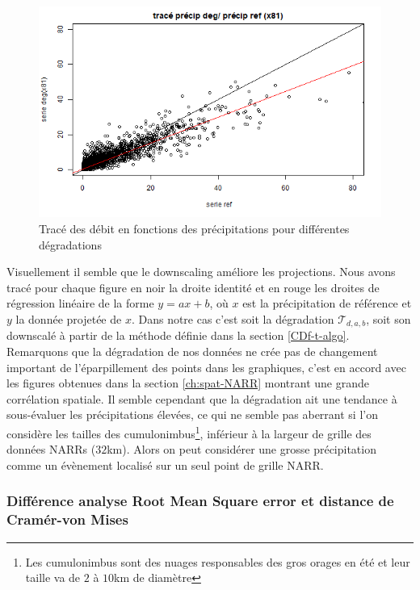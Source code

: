 \documentclass[a4paper,11pt]{article}
\begin{document}
\begin{figure}
\begin{minipage}[b]{0.48\linewidth}
	\end{minipage}\hfill
	\begin{minipage}[b]{0.48\linewidth}	
		\centering \includegraphics[scale=0.4]{images/pr_4_dg.png}
	\end{minipage}
	\caption{Tracé des débit en fonctions des précipitations pour différentes dégradations}
\end{figure} 


Visuellement il semble que le downscaling améliore les projections. Nous avons tracé pour chaque figure en noir la droite identité et en rouge les droites de régression linéaire de la forme $y=ax+b$, où $x$ est la précipitation de référence et $y$ la donnée projetée de $x$. Dans notre cas c'est soit la dégradation $\mathcal{T}_{d,a,b}$, soit son downscalé à partir de la méthode définie dans la section \ref{CDf-t-algo}. Remarquons que la dégradation de nos données ne crée pas de changement important de l'éparpillement des points dans les graphiques, c'est en accord avec les figures obtenues dans la section \ref{ch:spat-NARR} montrant une grande corrélation spatiale. Il semble cependant que la dégradation ait une tendance à sous-évaluer les précipitations élevées, ce qui ne semble pas aberrant si l'on considère les tailles des cumulonimbus\footnote{Les cumulonimbus sont des nuages responsables des gros orages en été et leur taille va de $2$ à $10$km de diamètre}, inférieur à la largeur de grille des données NARRs ($32$km). Alors on peut considérer une grosse précipitation comme un évènement localisé sur un seul point de grille NARR.

 

\subsubsection{Différence analyse Root Mean Square error et distance de Cramér-von Mises}
\label{ch:diff-RMSE}
\end{document}
